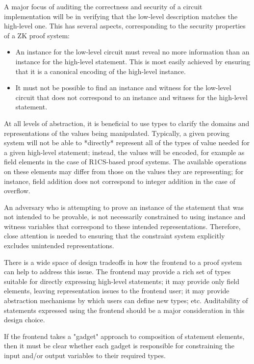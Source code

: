 A major focus of auditing the correctness and security of a circuit implementation will be in verifying that the low-level description matches the high-level one. This has several aspects, corresponding to the security properties of a ZK proof system:
\begin{itemize}
    \item An instance for the low-level circuit must reveal no more information than an instance for the high-level statement. This is most easily achieved by ensuring that it is a canonical encoding of the high-level instance.
    \item It must not be possible to find an instance and witness for the low-level circuit that does not correspond to an instance and witness for the high-level statement.
\end{itemize}

At all levels of abstraction, it is beneficial to use types to clarify the domains and representations of the values being manipulated. Typically, a given proving system will not be able to *directly* represent all of the types of value needed for a given high-level statement; instead, the values will be encoded, for example as field elements in the case of R1CS-based proof systems. The available operations on these elements may differ from those on the values they are representing; for instance, field addition does not correspond to integer addition in the case of overflow.

An adversary who is attempting to prove an instance of the statement that was not intended to be provable, is not necessarily constrained to using instance and witness variables that correspond to these intended representations. Therefore, close attention is needed to ensuring that the constraint system explicitly excludes unintended representations.

There is a wide space of design tradeoffs in how the frontend to a proof system can help to address this issue. The frontend may provide a rich set of types suitable for directly expressing high-level statements; it may provide only field elements, leaving representation issues to the frontend user; it may provide abstraction mechanisms by which users can define new types; etc. Auditability of statements expressed using the frontend should be a major consideration in this design choice.

If the frontend takes a "gadget" approach to composition of statement elements, then it must be clear whether each gadget is responsible for constraining the input and/or output variables to their required types.



